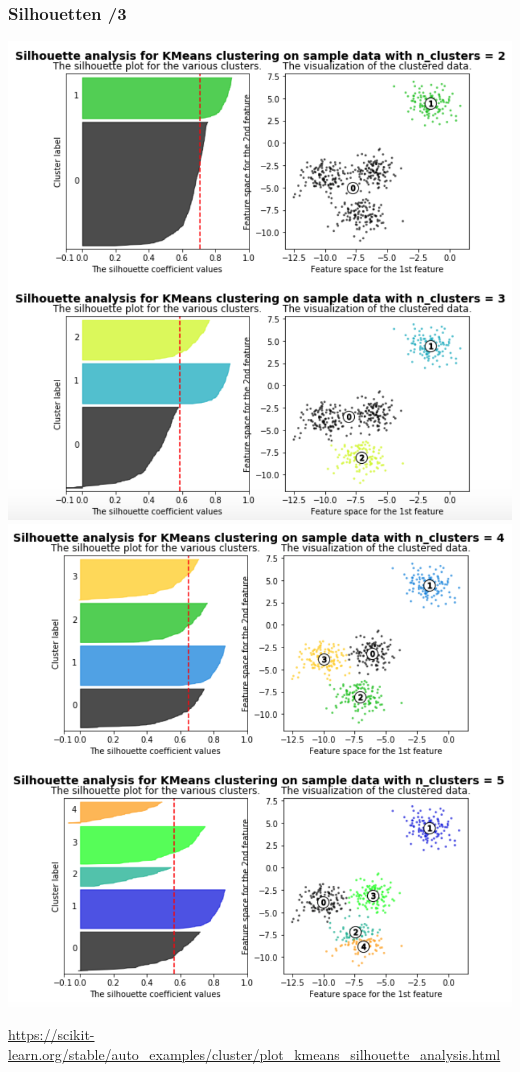 \begin{frame}
\frametitle{Silhouetten /3}

\begin{center}
\includegraphics[scale=.32]{fig7/silhouetten-1.png}
\includegraphics[scale=.32]{fig7/silhouetten-2.png}
\end{center}

\url{https://scikit-learn.org/stable/auto_examples/cluster/plot_kmeans_silhouette_analysis.html}

\end{frame}


